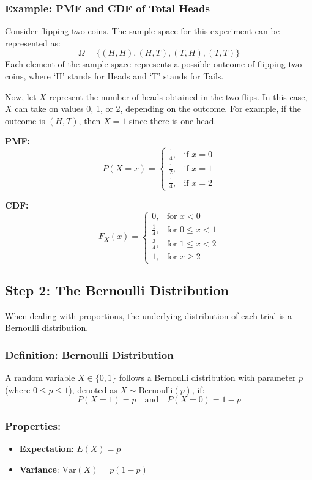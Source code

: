 \documentclass[11pt]{article}
\begin{document}
\subsubsection*{Example: PMF and CDF of Total Heads}

Consider flipping two coins. The sample space for this experiment can be represented as:
\[
\Omega = \{ (H, H), (H, T), (T, H), (T, T) \}
\]
Each element of the sample space represents a possible outcome of flipping two coins, where `H' stands for Heads and `T' stands for Tails.

Now, let \( X \) represent the number of heads obtained in the two flips. In this case, \( X \) can take on values 0, 1, or 2, depending on the outcome. For example, if the outcome is \((H, T)\), then \( X = 1 \) since there is one head.

\textbf{PMF:}
\[
P(X = x) =
\begin{cases}
    \frac{1}{4}, & \text{if } x = 0 \\
    \frac{1}{2}, & \text{if } x = 1 \\
    \frac{1}{4}, & \text{if } x = 2
\end{cases}
\]

\textbf{CDF:}
\[
F_X(x) =
\begin{cases}
    0, & \text{for } x < 0 \\
    \frac{1}{4}, & \text{for } 0 \leq x < 1 \\
    \frac{3}{4}, & \text{for } 1 \leq x < 2 \\
    1, & \text{for } x \geq 2
\end{cases}
\]


\subsection*{Step 2: The Bernoulli Distribution}

When dealing with proportions, the underlying distribution of each trial is a Bernoulli distribution.

\subsubsection*{Definition: Bernoulli Distribution}
A random variable \(X \in \{0,1\}\) follows a Bernoulli distribution with parameter \(p\) (where \(0 \leq p \leq 1\)), denoted as \(X \sim \text{Bernoulli}(p)\), if:
\[ P(X = 1) = p \quad \text{and} \quad P(X = 0) = 1 - p \]

\subsubsection*{Properties:}
\begin{itemize}
    \item \textbf{Expectation}: \(E(X) = p\)
    \item \textbf{Variance}: \(\text{Var}(X) = p(1-p)\)
\end{itemize}
\end{document}

